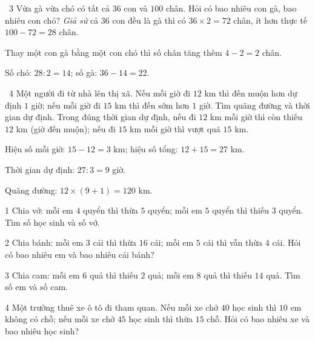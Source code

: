 \gap
\begin{exbox}{\ExWord\ 3}
Vừa gà vừa chó có tất cả $36$ con và $100$ chân. Hỏi có bao nhiêu con gà, bao nhiêu con chó?
\guide
\emph{Giả sử} cả $36$ con đều là gà thì có $36\times2=72$ chân, ít hơn thực tế $100-72=28$ chân.\par
Thay một con gà bằng một con chó thì số chân tăng thêm $4-2=2$ chân.\par Số chó: $28:2=14$; số gà: $36-14=22$.
\end{exbox}
\gap
\begin{exbox}{\ExWord\ 4}
Một người đi từ nhà lên thị xã. Nếu mỗi giờ đi $12$ km thì đến muộn hơn dự định $1$ giờ; nếu mỗi giờ đi $15$ km thì đến sớm hơn $1$ giờ. Tìm quãng đường và thời gian dự định.
\guide
Trong đúng thời gian dự định, nếu đi $12$ km mỗi giờ thì còn thiếu $12$ km (giờ đến muộn); nếu đi $15$ km mỗi giờ thì vượt quá $15$ km.\par
Hiệu số mỗi giờ: $15-12=3$ km; hiệu số tổng: $12+15=27$ km.\par Thời gian dự định: $27:3=9$ giờ.\par
Quãng đường: $12\times(9+1)=120$ km.
\end{exbox}
\begin{probbox}{1}{\relax}
Chia vở: mỗi em $4$ quyển thì thừa $5$ quyển; mỗi em $5$ quyển thì thiếu $3$ quyển. Tìm số học sinh và số vở.
\end{probbox}
\gap
\begin{probbox}{2}{\relax}
Chia bánh: mỗi em $3$ cái thì thừa $16$ cái; mỗi em $5$ cái thì vẫn thừa $4$ cái. Hỏi có bao nhiêu em và bao nhiêu cái bánh?
\end{probbox}
\gap
\begin{probbox}{3}{\relax}
Chia cam: mỗi em $6$ quả thì thiếu $2$ quả; mỗi em $8$ quả thì thiếu $14$ quả. Tìm số em và số cam.
\end{probbox}
\gap
\begin{probbox}{4}{\relax}
Một trường thuê xe ô tô đi tham quan. Nếu mỗi xe chở $40$ học sinh thì $10$ em không có chỗ; nếu mỗi xe chở $45$ học sinh thì thừa $15$ chỗ. Hỏi có bao nhiêu xe và bao nhiêu học sinh?
\end{probbox}
